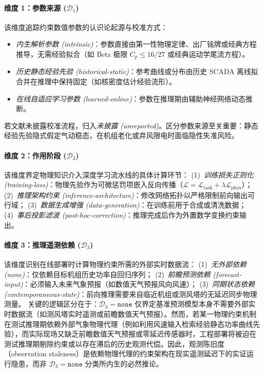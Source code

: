 \paragraph{维度 1：参数来源 ($\mathcal{D}_1$)}
该维度追踪约束数值参数的认识论起源与校准方式：
\begin{itemize}[leftmargin=1.5em,itemsep=1pt,topsep=2pt]
\item \textit{内生解析参数 (intrinsic)}：参数直接由第一性物理定律、出厂铭牌或经典方程推导，无需经验拟合（如 Betz 极限 $C_p \le 16/27$ 或经典运动学尾流方程）。
\item \textit{历史静态经验先验 (historical-static)}：参考曲线或分布由历史 SCADA 离线拟合并在推理中保持固定（如核密度估计经验流形）。
\item \textit{在线自适应学习参数 (learned-online)}：参数在推理期由辅助神经网络动态推断。
\end{itemize}
若文献未披露校准流程，归入\textit{未披露 (unreported)}。区分参数来源至关重要：静态经验先验隐式假定气动稳态，在机组老化或弃风限电时面临隐性失准风险。

\paragraph{维度 2：作用阶段 ($\mathcal{D}_2$)}
该维度界定物理知识介入深度学习流水线的具体计算环节：
(1)~\textit{训练损失正则化 (training-loss)}：物理先验作为可微惩罚项嵌入反向传播（$\mathcal{L} = \mathcal{L}_{\text{task}} + \lambda \mathcal{L}_{\text{phys}}$）；
(2)~\textit{推理架构约束 (inference-architecture)}：修改网络拓扑以严格限制前向输出可行域；
(3)~\textit{数据生成增强 (data-generation)}：在训练前用于合成或清洗数据；
(4)~\textit{事后投影滤波 (post-hoc-correction)}：推理完成后作为外置数学变换约束输出。

\paragraph{维度 3：推理遥测依赖 ($\mathcal{D}_3$)}
该维度识别在线部署时计算物理约束所需的外部实时数据流：
(1)~\textit{无外部依赖 (none)}：仅依赖目标机组历史功率自回归序列；
(2)~\textit{前瞻预测依赖 (forecast-input)}：必须输入未来气象预报（如数值天气预报风向风速）；
(3)~\textit{同期状态依赖 (contemporaneous-state)}：前向推理需要来自临近机组或测风塔的无延迟同步物理测量。
关键的逻辑区分在于：$\mathcal{D}_3 = \texttt{none}$ 仅界定基准预测模型本身不需要外部实时数据流（如测风塔实时遥测或前瞻数值天气预报）。然而，若某一物理约束机制在测试推理期依赖外部气象物理代理（例如利用风速输入检索经验静态功率曲线先验），而实际现场又缺乏前瞻数值天气预报或零延迟传感器时，工程部署将被迫在测试推理期剔除约束或以存在滞后的历史观测代偿。因此，观测陈旧度（observation staleness）是依赖物理代理的约束架构在现实遥测延迟下的实证运行隐患，而非 $\mathcal{D}_3 = \texttt{none}$ 分类所内生的必然推论。

